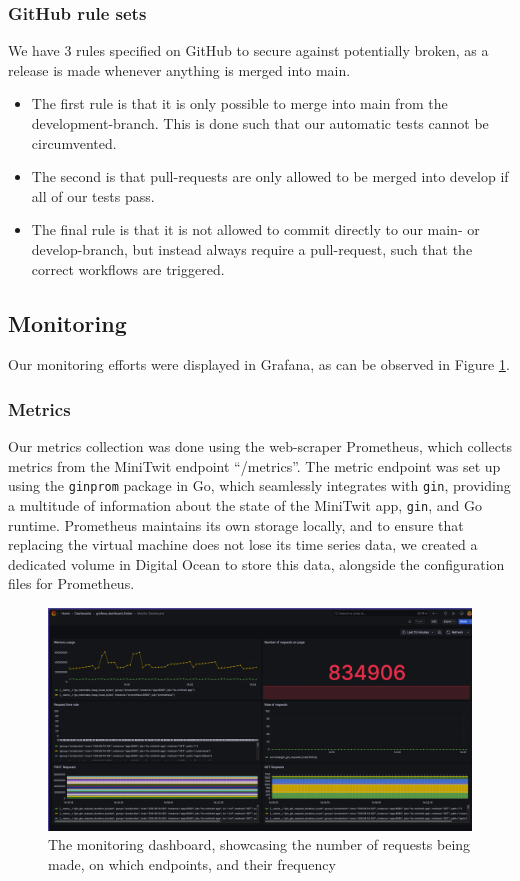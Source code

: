 \subsubsection*{GitHub rule sets}
We have 3 rules specified on GitHub to secure against potentially broken, as a release is made whenever anything is merged into main. 

\begin{itemize}
    \item The first rule is that it is only possible to merge into main from the development-branch. This is done such that our automatic tests cannot be circumvented.
    \item The second is that pull-requests are only allowed to be merged into develop if all of our tests pass.
    \item The final rule is that it is not allowed to commit directly to our main- or develop-branch, but instead always require a pull-request, such that the correct workflows are triggered.
\end{itemize}
\subsection{Monitoring}
 Our monitoring efforts were displayed in Grafana, as can be observed in Figure \ref{fig:monitor}.
\subsubsection{Metrics}
Our metrics collection was done using the web-scraper Prometheus, which collects metrics from the MiniTwit endpoint “/metrics”. The metric endpoint was set up using the \texttt{ginprom} package in Go, which seamlessly integrates with \texttt{gin}, providing a multitude of information about the state of the MiniTwit app, \texttt{gin}, and Go runtime. Prometheus maintains its own storage locally, and to ensure that replacing the virtual machine does not lose its time series data, we created a dedicated volume in Digital Ocean to store this data, alongside the configuration files for Prometheus. 

\begin{figure} [H]
    \centering
    \includegraphics[width=1\linewidth]{pictures/Monitor.png}
    \caption{The monitoring dashboard, showcasing the number of requests being made, on which endpoints, and their frequency}
    \label{fig:monitor}
\end{figure}

